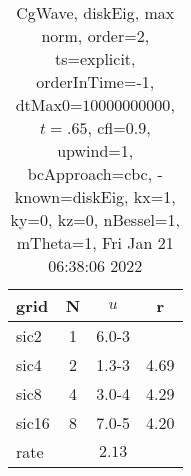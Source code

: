 \begin{table}[H]\tableFont %
\begin{center}
\begin{tabular}{|l|c|c|c|} \hline 
grid  & N &  $ u $ & r \\ \hline 
      sic2 &     1 & \num{6.0}{-3} &        \\ \hline
      sic4 &     2 & \num{1.3}{-3} &  4.69  \\ \hline
      sic8 &     4 & \num{3.0}{-4} &  4.29  \\ \hline
     sic16 &     8 & \num{7.0}{-5} &  4.20  \\ \hline
    rate             &       &  $2.13$       &       \\ \hline
\end{tabular}
\caption{CgWave, diskEig, max norm, order=$2$, ts=explicit, orderInTime=-1, dtMax0=$10000000000$, $t=.65$, cfl=$0.9$, upwind=1, bcApproach=cbc, -known=diskEig, kx=1, ky=0, kz=0, nBessel=1, mTheta=1, Fri Jan 21 06:38:06 2022}\label{table:diskEigOrder2max}
\end{center}
\end{table}
